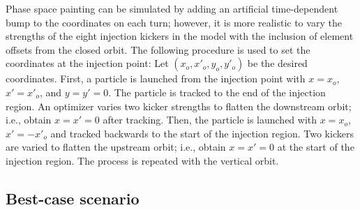 Phase space painting can be simulated by adding an artificial time-dependent bump to the coordinates on each turn; however, it is more realistic to vary the strengths of the eight injection kickers in the model with the inclusion of element offsets from the closed orbit. The following procedure is used to set the coordinates at the injection point: Let $(x_o, x'_o, y_o, y'_o)$ be the desired coordinates. First, a particle is launched from the injection point with $x = x_o$, $x' = x'_o$, and $y = y' = 0$. The particle is tracked to the end of the injection region. An optimizer varies two kicker strengths to flatten the downstream orbit; i.e., obtain $x = x' = 0$ after tracking. Then, the particle is launched with $x = x_o$, $x' = -x'_o$ and tracked backwards to the start of the injection region. Two kickers are varied to flatten the upstream orbit; i.e., obtain $x = x' = 0$ at the start of the injection region. The process is repeated with the vertical orbit.


\subsection{Best-case scenario}

